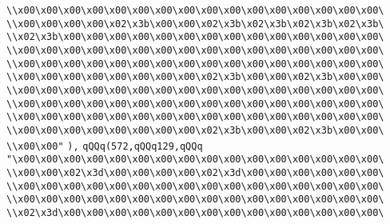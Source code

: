 \verb|\\x00\x00\x00\x00\x00\x00\x00\x00\x00\x00\x00\x00\x00\x00\x00\x00\|\newline
\verb|\\x00\x00\x00\x00\x02\x3b\x00\x00\x02\x3b\x02\x3b\x02\x3b\x02\x3b\|\newline
\verb|\\x02\x3b\x00\x00\x00\x00\x00\x00\x00\x00\x00\x00\x00\x00\x00\x00\|\newline
\verb|\\x00\x00\x00\x00\x00\x00\x00\x00\x00\x00\x00\x00\x00\x00\x00\x00\|\newline
\verb|\\x00\x00\x00\x00\x00\x00\x00\x00\x00\x00\x00\x00\x00\x00\x00\x00\|\newline
\verb|\\x00\x00\x00\x00\x00\x00\x00\x00\x02\x3b\x00\x00\x02\x3b\x00\x00\|\newline
\verb|\\x00\x00\x00\x00\x00\x00\x00\x00\x00\x00\x00\x00\x00\x00\x00\x00\|\newline
\verb|\\x00\x00\x00\x00\x00\x00\x00\x00\x00\x00\x00\x00\x00\x00\x00\x00\|\newline
\verb|\\x00\x00\x00\x00\x00\x00\x00\x00\x00\x00\x00\x00\x00\x00\x00\x00\|\newline
\verb|\\x00\x00\x00\x00\x00\x00\x00\x00\x02\x3b\x00\x00\x02\x3b\x00\x00\|\newline
\verb|\\x00\x00"|\newline
\verb|),|\newline
\verb|qQQq(572,qQQq129,qQQq|\newline
\verb|"\x00\x00\x00\x00\x00\x00\x00\x00\x00\x00\x00\x00\x00\x00\x00\x00\|\newline
\verb|\\x00\x00\x02\x3d\x00\x00\x00\x00\x02\x3d\x00\x00\x00\x00\x00\x00\|\newline
\verb|\\x00\x00\x00\x00\x00\x00\x00\x00\x00\x00\x00\x00\x00\x00\x00\x00\|\newline
\verb|\\x00\x00\x00\x00\x00\x00\x00\x00\x00\x00\x00\x00\x00\x00\x00\x00\|\newline
\verb|\\x02\x3d\x00\x00\x00\x00\x00\x00\x00\x00\x00\x00\x00\x00\x00\x00\|\newline
